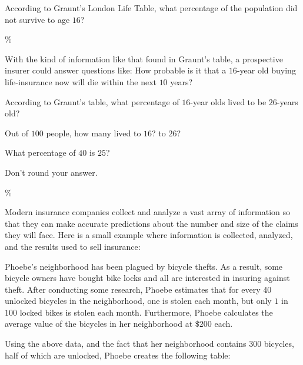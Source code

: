 \documentclass{ximera}
\begin{document}
\begin{question}
According to Graunt's London Life Table, what percentage of the population did not survive to age $16$?

\%
	
\end{question}

With the kind of information like that found in Graunt's table, a prospective insurer could answer questions like: How probable is it that a $16$-year old buying life-insurance now will die within the next $10$ years?

\begin{question}
According to Graunt's table, what percentage of $16$-year olds lived to be $26$-years old?

\begin{hint}
Out of $100$ people, how many lived to $16$? to $26$?
\end{hint}
\begin{hint}
What percentage of $40$ is $25$? 
\end{hint}
\begin{hint}
Don't round your answer.
\end{hint}
$\%$
	
\end{question}

Modern insurance companies collect and analyze a vast array of information so that they can make accurate predictions about the number and size of the claims they will face. Here is a small example where information is collected, analyzed, and the results used to sell insurance:

Phoebe's neighborhood has been plagued by bicycle thefts. As a result, some bicycle owners have bought bike locks and all are interested in insuring against theft. After conducting some research, Phoebe estimates that for every 40 unlocked bicycles in the neighborhood, one is stolen each month, but only $1$ in $100$ locked bikes is stolen each month. Furthermore, Phoebe calculates the average value of the bicycles in her neighborhood at $\$200$ each.

Using the above data, and the fact that her neighborhood contains 300 bicycles, half of which are unlocked, Phoebe creates the following table:
\end{document}

